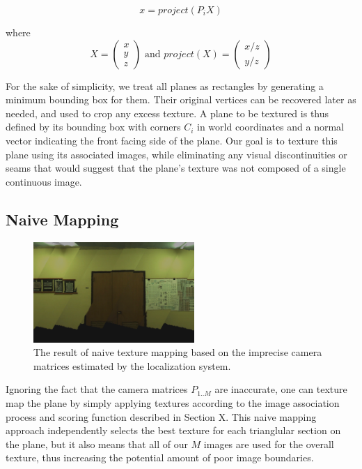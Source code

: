 \documentclass[10pt,twocolumn,letterpaper]{article}
\begin{document}
\[
x=project(P_iX)
\]

where
\[X = \begin{pmatrix} x \\ y \\ z \end{pmatrix} \textrm{ and }
project(X) = \begin{pmatrix} x/z \\ y/z \end{pmatrix}
\]

For the sake of simplicity, we treat all planes as rectangles by generating a minimum bounding box for them. Their original vertices can be recovered later as needed, and used to crop any excess texture. A plane to be textured is thus defined by its bounding box with corners $C_i$ in
world coordinates and a normal vector indicating the front facing side
of the plane. Our goal is to texture this plane using its associated
images, while eliminating any visual discontinuities or seams that
would suggest that the plane's texture was not composed of a single
continuous image.



\subsection{Naive Mapping}
\label{sec:naive}
\begin{figure}
  \centering
  \includegraphics[height=1.5in]{naive.png}
  \caption{The result of naive texture mapping based on the imprecise
    camera matrices estimated by the localization system.}
  \label{fig:naive}
\end{figure}


Ignoring the fact that the camera matrices $P_{1..M}$ are inaccurate,
one can texture map the plane by simply applying textures according to
the image association process and scoring function described in
Section X. This naive mapping approach independently selects the best
texture for each trianglular section on the plane, but it also means
that all of our $M$ images are used for the overall texture, thus
increasing the potential amount of poor image boundaries.
\end{document}
